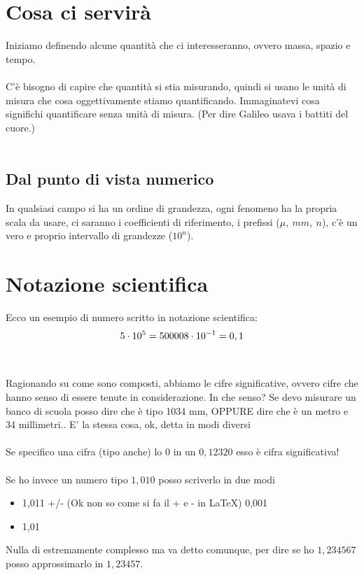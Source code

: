\documentclass[12pt, a4paper, openany, oneside]{book}
\begin{document}
\section{Cosa ci servirà}
Iniziamo definendo alcune quantità che ci interesseranno, ovvero massa, spazio 
e tempo.
\\ \\
C'è bisogno di capire che quantità si stia misurando, quindi si usano le unità 
di misura che cosa oggettivamente stiamo quantificando. Immaginatevi cosa 
significhi quantificare senza unità di misura. (Per dire Galileo usava i 
battiti del cuore.)
\\ \\
\subsection{Dal punto di vista numerico}
In qualsiasi campo si ha un ordine di grandezza, ogni fenomeno ha la
propria scala da usare, ci saranno i coefficienti di riferimento, i prefissi
($\mu,~ mm, ~ n$), c'è un vero e proprio intervallo di grandezze ($10^{n}$).
\section{Notazione scientifica}
Ecco un esempio di numero scritto in notazione scientifica: 
\[
5 \cdot 10^{5} = 50000 \\
8 \cdot 10^{-1} = 0,1 
\]
\\ \\
Ragionando su come sono composti, abbiamo le cifre significative, ovvero cifre
che hanno senso di essere tenute in considerazione. In che senso? Se devo 
misurare un banco di scuola posso dire che è tipo 1034 mm, OPPURE dire che è un
metro e 34 millimetri.. E' la stessa cosa, ok, detta in modi diversi
\\ \\
Se specifico una cifra (tipo anche) lo 0 in un $0,12320$ esso è cifra significativa!
\\ \\
Se ho invece un numero tipo $1,010$ posso scriverlo in due modi
\begin{itemize}
	\item 1,011 +/- (Ok non so come si fa il + e - in \LaTeX) 0,001
	\item 1,01 
\end{itemize}
Nulla di estremamente complesso ma va detto comunque, per dire se ho $1,234567$
posso approssimarlo in $1,23457$. \\ \\
\end{document}
